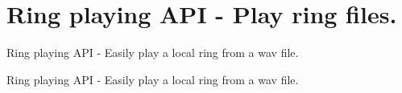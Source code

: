 \section{Ring playing A\+PI -\/ Play ring files.}
\label{group__ring__api}


Ring playing A\+PI -\/ Easily play a local ring from a wav file.  


Ring playing A\+PI -\/ Easily play a local ring from a wav file. 

